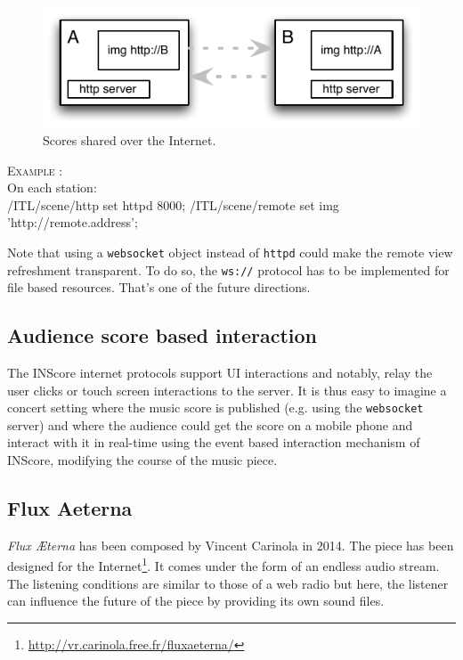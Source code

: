 \documentclass{article}
\newcounter{samplenum}
\newcommand{\code}[1]		{{\small \texttt{#1}}}
\newcommand{\sample}[1]		{ 	
								\begin{center}\colorbox{mygrey}{
								\begin{minipage}[t]{0.99\columnwidth} 
								\textsc{Example} \arabic{samplenum}: \vspace{1mm} \\
								\ttfamily \small #1  
								\end{minipage}}\end{center}
								\stepcounter{samplenum}
							}
\begin{document}
\begin{figure}[h]
\centering
\includegraphics[width=0.8\columnwidth]{img/sharedscore}
\caption{Scores shared over the Internet.}
\label{fig:sharedscore}
\end{figure}

\sample {
	On each station: \\
\hspace*{5mm}	/ITL/scene/http set httpd 8000;
\hspace*{5mm}	/ITL/scene/remote set img \\
	\hspace*{25mm}'http://remote.address';
}

Note that using a \code{websocket} object instead of \code{httpd} could make the remote view refreshment transparent. To do so, the \code{ws://} protocol has to be implemented for file based resources. That's one of the future directions.


\subsection{Audience score based interaction}
The INScore internet protocols support UI interactions and notably, relay the user clicks or touch screen interactions to the server. It is thus easy to imagine a concert setting where the music score is published (e.g. using the \code{websocket} server) and where the audience could get the score on a mobile phone and interact with it in real-time using the event based interaction mechanism of INScore, modifying the course of the music piece. 


\subsection{Flux Aeterna}

\textit{Flux \AE terna} has been composed by Vincent Carinola in 2014. The piece has been designed for the Internet\footnote{\url{http://vr.carinola.free.fr/fluxaeterna/}}. It comes under the form of an endless audio stream. The listening conditions are similar to those of a web radio but here, the listener can  influence the future of the piece by providing its own sound files.
\end{document}
